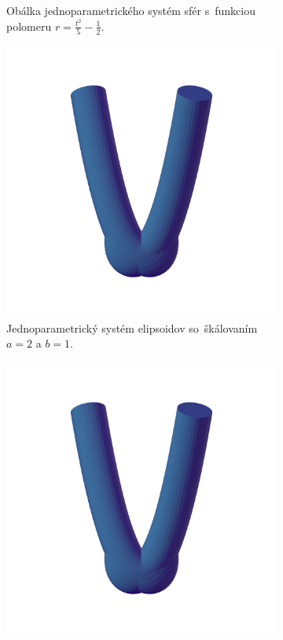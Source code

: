 \documentclass[12pt, twoside]{book}
\begin{document}
\begin{figure}[h]
\begin{subfigure}[t]{0.49\textwidth}
        	\caption{Obálka jednoparametrického systém sfér s~funkciou polomeru $r=\frac{t^2}{5}-\frac{1}{2}$.}
        \label{fig:plocha4}
    \end{subfigure}
    \begin{subfigure}[t]{0.49\textwidth}
        \centering
        \includegraphics[width=\textwidth, trim=0mm 50mm 0mm 50mm, clip=true]{images/bienert_ellipsoids.png}
		\caption{Jednoparametrický systém elipsoidov so~škálovaním $a=2$ a $b=1$.}
        \label{fig:plocha5}
    \end{subfigure}
    \hfill
    \begin{subfigure}[t]{0.49\textwidth}
        \centering
        \includegraphics[width=\textwidth, trim=0mm 50mm 0mm 100mm, clip=true]{images/bienert_ellipsoids.png}

\end{subfigure}
\end{figure}
\end{document}
